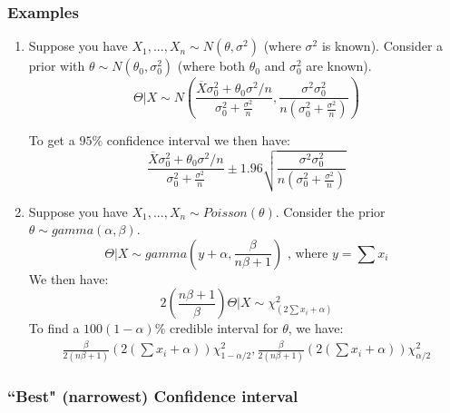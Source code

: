 \documentclass{article}
\begin{document}
\subsubsection{Examples}
\begin{enumerate}
    \item Suppose you have $X_1,...,X_n \sim N(\theta,\sigma^2)$ (where $\sigma^2$ is known). Consider a prior with $\theta \sim N(\theta_0,\sigma_0^2)$ (where both $\theta_0$ and $\sigma_0^2$ are known).
    \begin{equation*}
        \Theta|X \sim N \left( \frac{\overline{X}\sigma_0^2 + \theta_0 \sigma^2/n }{\sigma_0^2 + \frac{\sigma^2}{n}} , \frac{\sigma^2 \sigma_0^2}{n\left(\sigma_0^2 + \frac{\sigma^2}{n}\right)} \right)
    \end{equation*}
    
    To get a $95\%$ confidence interval we then have:
        \begin{equation*}
            \frac{\overline{X}\sigma_0^2 + \theta_0 \sigma^2/n }{\sigma_0^2 + \frac{\sigma^2}{n}} \pm 1.96\sqrt{\frac{\sigma^2 \sigma_0^2}{n\left(\sigma_0^2 + \frac{\sigma^2}{n}\right)}}
        \end{equation*}

    \item Suppose you have $X_1,...,X_n \sim Poisson(\theta)$. Consider the prior $\theta \sim gamma(\alpha,\beta)$.
    \begin{equation*}
        \Theta|X \sim gamma\left(y+\alpha,\frac{\beta}{n\beta + 1}\right) \text{ , where } y = \sum x_i
    \end{equation*}
    We then have:
    \begin{equation*}
        2\left(\frac{n\beta + 1}{\beta} \right) \Theta  | X \sim \chi^2_{(2\sum x_i + \alpha)}
    \end{equation*}
    To find a $100(1-\alpha)\%$ credible interval for $\theta$, we have:
    \begin{equation*}
        \begin{split}
            \frac{\beta}{2(n\beta +1)}\left(2\left(\sum x_i + \alpha \right) \right)\chi^2_{1-\alpha/2}, \frac{\beta}{2(n\beta +1)}\left(2\left(\sum x_i + \alpha \right) \right)\chi^2_{\alpha/2}
        \end{split}
    \end{equation*}
\end{enumerate}



\subsubsection{``Best" (narrowest) Confidence interval}
\end{document}
